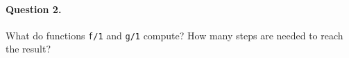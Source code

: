
\paragraph{Question 2.}

What do functions \texttt{f/1} and \texttt{g/1} compute? How many
steps are needed to reach the result?
{\small}
